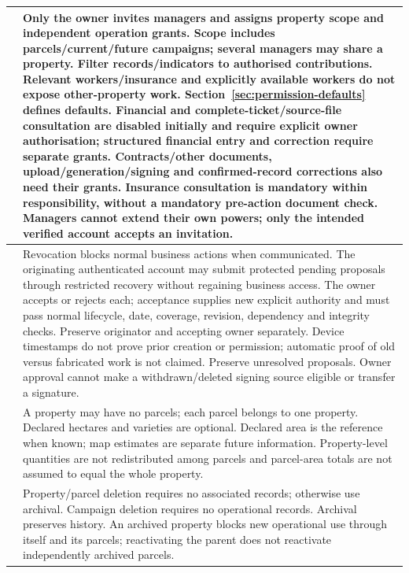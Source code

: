 {\begin{longtable}{L{0.12}L{0.88}}
\midrule
{}\label{br:003}\textbf{} & Only the owner invites managers and assigns property scope and independent operation grants. Scope includes parcels/current/future campaigns; several managers may share a property. Filter records/indicators to authorised contributions. Relevant workers/insurance and explicitly available workers do not expose other-property work. Section~\ref{sec:permission-defaults} defines defaults. Financial and complete-ticket/source-file consultation are disabled initially and require explicit owner authorisation; structured financial entry and correction require separate grants. Contracts/other documents, upload/generation/signing and confirmed-record corrections also need their grants. Insurance consultation is mandatory within responsibility, without a mandatory pre-action document check. Managers cannot extend their own powers; only the intended verified account accepts an invitation. \\
\midrule
{}\label{br:004}\textbf{} & Revocation blocks normal business actions when communicated. The originating authenticated account may submit protected pending proposals through restricted recovery without regaining business access. The owner accepts or rejects each; acceptance supplies new explicit authority and must pass normal lifecycle, date, coverage, revision, dependency and integrity checks. Preserve originator and accepting owner separately. Device timestamps do not prove prior creation or permission; automatic proof of old versus fabricated work is not claimed. Preserve unresolved proposals. Owner approval cannot make a withdrawn/deleted signing source eligible or transfer a signature.\\
\midrule
{}\label{br:005}\textbf{} & A property may have no parcels; each parcel belongs to one property. Declared hectares and varieties are optional. Declared area is the reference when known; map estimates are separate future information. Property-level quantities are not redistributed among parcels and parcel-area totals are not assumed to equal the whole property. \\
\midrule
{}\label{br:006}\textbf{} & Property/parcel deletion requires no associated records; otherwise use archival. Campaign deletion requires no operational records. Archival preserves history. An archived property blocks new operational use through itself and its parcels; reactivating the parent does not reactivate independently archived parcels. \\

\end{longtable}}
